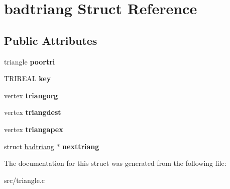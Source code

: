 \hypertarget{structbadtriang}{
\section{badtriang Struct Reference}
\label{structbadtriang}
}
\subsection*{Public Attributes}
\begin{DoxyCompactItemize}
\item 
\hypertarget{structbadtriang_a11b132e0890478d17dff89632f334430}{
triangle {\bfseries poortri}}
\label{structbadtriang_a11b132e0890478d17dff89632f334430}

\item 
\hypertarget{structbadtriang_a7a32947ed53f1081d2c1f1bbf7104e63}{
TRIREAL {\bfseries key}}
\label{structbadtriang_a7a32947ed53f1081d2c1f1bbf7104e63}

\item 
\hypertarget{structbadtriang_a92cb1bf38baf5779865262bacc7f8139}{
vertex {\bfseries triangorg}}
\label{structbadtriang_a92cb1bf38baf5779865262bacc7f8139}

\item 
\hypertarget{structbadtriang_ab1ad44ac98c5e8fd7940ad45f6ef25d1}{
vertex {\bfseries triangdest}}
\label{structbadtriang_ab1ad44ac98c5e8fd7940ad45f6ef25d1}

\item 
\hypertarget{structbadtriang_a44ad69b4811716b4adf50f50b98ab7f0}{
vertex {\bfseries triangapex}}
\label{structbadtriang_a44ad69b4811716b4adf50f50b98ab7f0}

\item 
\hypertarget{structbadtriang_abe7ce1ffe7da4fe5cb17ebcbaa18515b}{
struct \hyperlink{structbadtriang}{badtriang} $\ast$ {\bfseries nexttriang}}
\label{structbadtriang_abe7ce1ffe7da4fe5cb17ebcbaa18515b}

\end{DoxyCompactItemize}


The documentation for this struct was generated from the following file:\begin{DoxyCompactItemize}
\item 
src/triangle.c\end{DoxyCompactItemize}

